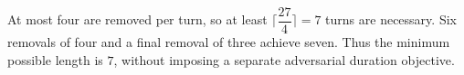 At most four are removed per turn, so at least $\lceil\dfrac{27}{4}\rceil=7$ turns are necessary. Six removals of four and a final removal of three achieve seven. Thus the minimum possible length is $\boxed7$, without imposing a separate adversarial duration objective.
